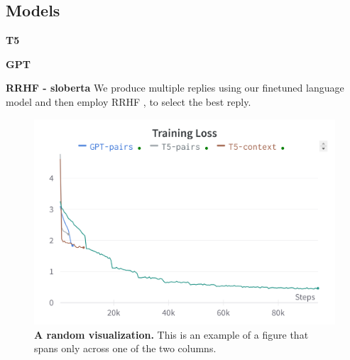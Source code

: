 \documentclass[fleqn,moreauthors,10pt]{ds_report}
\begin{document}
    \subsection*{Models}
    
    \noindent\textbf{T5}
    
    \noindent\textbf{GPT}
    
    \noindent\textbf{RRHF - sloberta}
    We produce multiple replies using our finetuned language model and then employ RRHF \cite{yuan2023rrh}, to select the best reply.

   












\begin{figure}[ht]\centering
	\includegraphics[width=\linewidth]{fig/training_loss.png}
	\caption{\textbf{A random visualization.} This is an example of a figure that spans only across one of the two columns.}
	\label{fig:column}
\end{figure}
\end{document}
